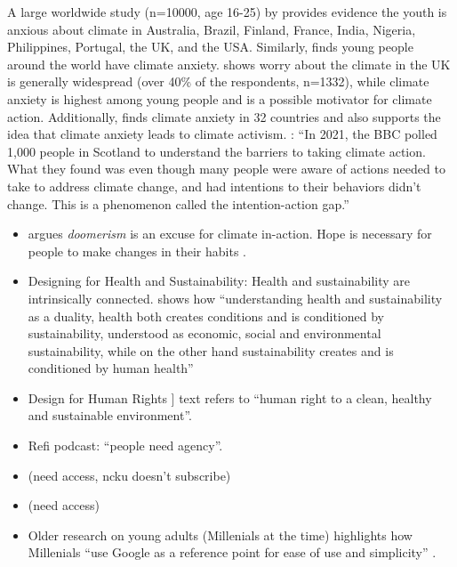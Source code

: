 \documentclass[
  letterpaper,
  DIV=11,
  numbers=noendperiod]{scrartcl}
\begin{document}
A large worldwide study (n=10000, age 16-25) by
\citep{hickmanClimateAnxietyChildren2021} provides evidence the youth is
anxious about climate in Australia, Brazil, Finland, France, India,
Nigeria, Philippines, Portugal, the UK, and the USA. Similarly,
\citep{thompsonYoungPeopleClimate2021} finds young people around the
world have climate anxiety. \citep{whitmarshClimateAnxietyWhat2022}
shows worry about the climate in the UK is generally widespread (over
40\% of the respondents, n=1332), while climate anxiety is highest among
young people and is a possible motivator for climate action.
Additionally, \citep{ogunbodeClimateAnxietyWellbeing2022} finds climate
anxiety in 32 countries and also supports the idea that climate anxiety
leads to climate activism. \citep{thibodeauThreeCompaniesClosing2022}:
``In 2021, the BBC polled 1,000 people in Scotland to understand the
barriers to taking climate action. What they found was even though many
people were aware of actions needed to take to address climate change,
and had intentions to their behaviors didn't change. This is a
phenomenon called the intention-action gap.''

\begin{itemize}
\item
  \citep{osakaWhyClimateDoomers2023} argues \emph{doomerism} is an
  excuse for climate in-action. Hope is necessary for people to make
  changes in their habits \citep{marlonHowHopeDoubt2019}.
\item
  Designing for Health and Sustainability: Health and sustainability are
  intrinsically connected. \citep{kjaergardHealthSustainability2014}
  shows how ``understanding health and sustainability as a duality,
  health both creates conditions and is conditioned by sustainability,
  understood as economic, social and environmental sustainability, while
  on the other hand sustainability creates and is conditioned by human
  health''
\item
  Design for Human Rights
  \citep{unfcccSharmElSheikhImplementation2023}{]} text refers to
  ``human right to a clean, healthy and sustainable environment''.
\item
  Refi podcast: ``people need agency''.
\item
  \citet{martiskainenContextualizingClimateJustice2020} (need access,
  ncku doesn't subscribe)
\item
  \citet{seabrookMusicTherapyEra2020} (need access)
\item
  Older research on young adults (Millenials at the time) highlights how
  Millenials ``use Google as a reference point for ease of use and
  simplicity'' \citep{katemoranDesigningYoungAdults2016}.
\end{itemize}
\end{document}
